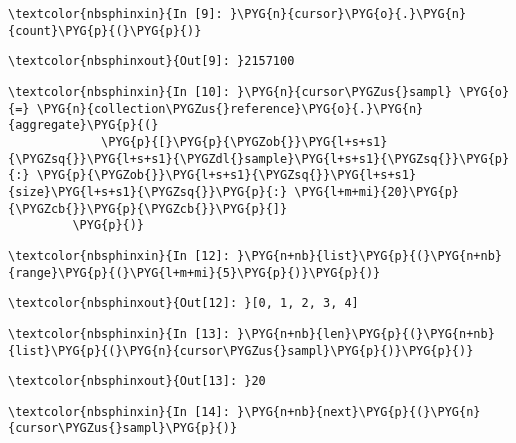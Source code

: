 \documentclass[letterpaper,10pt,english]{sphinxmanual}
\begin{document}
%
\begin{Verbatim}[commandchars=\\\{\}]
\textcolor{nbsphinxin}{In [9]: }\PYG{n}{cursor}\PYG{o}{.}\PYG{n}{count}\PYG{p}{(}\PYG{p}{)}
\end{Verbatim}

%
\begin{Verbatim}[commandchars=\\\{\}]
\textcolor{nbsphinxout}{Out[9]: }2157100
\end{Verbatim}

%
\begin{Verbatim}[commandchars=\\\{\}]
\textcolor{nbsphinxin}{In [10]: }\PYG{n}{cursor\PYGZus{}sampl} \PYG{o}{=} \PYG{n}{collection\PYGZus{}reference}\PYG{o}{.}\PYG{n}{aggregate}\PYG{p}{(}
             \PYG{p}{[}\PYG{p}{\PYGZob{}}\PYG{l+s+s1}{\PYGZsq{}}\PYG{l+s+s1}{\PYGZdl{}sample}\PYG{l+s+s1}{\PYGZsq{}}\PYG{p}{:} \PYG{p}{\PYGZob{}}\PYG{l+s+s1}{\PYGZsq{}}\PYG{l+s+s1}{size}\PYG{l+s+s1}{\PYGZsq{}}\PYG{p}{:} \PYG{l+m+mi}{20}\PYG{p}{\PYGZcb{}}\PYG{p}{\PYGZcb{}}\PYG{p}{]}
         \PYG{p}{)}
\end{Verbatim}

%
\begin{Verbatim}[commandchars=\\\{\}]
\textcolor{nbsphinxin}{In [12]: }\PYG{n+nb}{list}\PYG{p}{(}\PYG{n+nb}{range}\PYG{p}{(}\PYG{l+m+mi}{5}\PYG{p}{)}\PYG{p}{)}
\end{Verbatim}

%
\begin{Verbatim}[commandchars=\\\{\}]
\textcolor{nbsphinxout}{Out[12]: }[0, 1, 2, 3, 4]
\end{Verbatim}

%
\begin{Verbatim}[commandchars=\\\{\}]
\textcolor{nbsphinxin}{In [13]: }\PYG{n+nb}{len}\PYG{p}{(}\PYG{n+nb}{list}\PYG{p}{(}\PYG{n}{cursor\PYGZus{}sampl}\PYG{p}{)}\PYG{p}{)}
\end{Verbatim}

%
\begin{Verbatim}[commandchars=\\\{\}]
\textcolor{nbsphinxout}{Out[13]: }20
\end{Verbatim}

%
\begin{Verbatim}[commandchars=\\\{\}]
\textcolor{nbsphinxin}{In [14]: }\PYG{n+nb}{next}\PYG{p}{(}\PYG{n}{cursor\PYGZus{}sampl}\PYG{p}{)}
\end{Verbatim}
\end{document}
